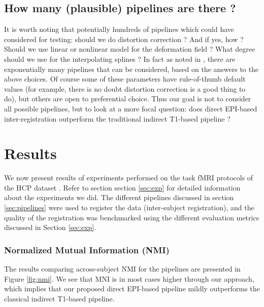 \subsection{How many (plausible) pipelines are there ?}
It is worth noting that potentially hundreds of pipelines which could
have considered for testing: should we do distortion correction ? And
if yes, how ? Should we use linear or nonlinear model for the
deformation field ?
%
What degree should we use for the interpolating splines ? In fact as
noted in \citep{Poldrack059188}, there are exponentially many pipelines
that can be considered, based on the answers to the above choices.
%
Of course some of these parameters have rule-of-thumb default values
(for example, there is no doubt distortion correction is a good thing
to do), but others are open to preferential choice. Thus our goal is
not to consider all possible pipelines, but to look at a more focal
question: does direct EPI-based inter-registration outperform the
traditional indirect T1-based pipeline ?


\section{Results}
\label{sec:results}
We now present results of experiments performed on the task fMRI
protocols of the HCP dataset \citep{VanEssen20122222}. Refer to
section section \ref{sec:exp} for detailed information about the
experiments we did. The different pipelines discussed in section
\ref{sec:pipelines} were used to register the data (inter-subject
registration), and the quality of the registration was benchmarked
using the different evaluation metrics discussed in Section \ref{sec:exp}. 

\subsubsection{Normalized Mutual Information (NMI)}
The results comparing across-subject NMI for the pipelines are presented in Figure \ref{fig:nmi}. We see that MNI is in most cases higher through our approach, which implies that 
our proposed direct EPI-based pipeline mildly outperforms the classical indirect T1-based pipeline.

